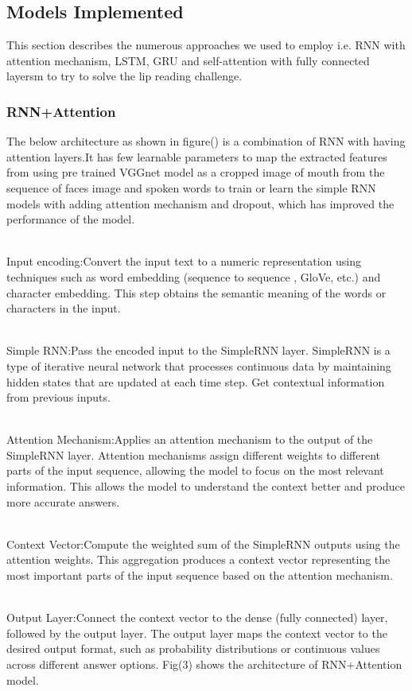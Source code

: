 \documentclass[conference]{IEEEtran}
\begin{document}
\subsection{Models Implemented}
This section describes the numerous approaches we used to employ i.e. RNN with attention mechanism, LSTM, GRU and self-attention with fully connected layersm to try to solve the lip reading challenge. 
\subsubsection{RNN+Attention}
The below architecture as shown in figure() is a combination of RNN with having attention layers.It has few learnable parameters to map the extracted features from using pre trained VGGnet model as a cropped image of mouth from the sequence of faces image and spoken words to train or learn the simple RNN models with adding attention mechanism and dropout, which has improved the performance of the model.

\\ Input encoding:Convert the input text to a numeric representation using techniques such as word embedding (sequence to sequence , GloVe, etc.) and character embedding. This step obtains the semantic meaning of the words or characters in the input.

\\ Simple RNN:Pass the encoded input to the SimpleRNN layer. SimpleRNN is a type of iterative neural network that processes continuous data by maintaining hidden states that are updated at each time step. Get contextual information from previous inputs. 

\\ Attention Mechanism:Applies an attention mechanism to the output of the SimpleRNN layer. Attention mechanisms assign different weights to different parts of the input sequence, allowing the model to focus on the most relevant information. This allows the model to understand the context better and produce more accurate answers.

\\ Context Vector:Compute the weighted sum of the SimpleRNN outputs using the attention weights. This aggregation produces a context vector representing the most important parts of the input sequence based on the attention mechanism. 

\\ Output Layer:Connect the context vector to the dense (fully connected) layer, followed by the output layer. The output layer maps the context vector to the desired output format, such as probability distributions or continuous values across different answer options. Fig(3) shows the architecture of RNN+Attention model.
\end{document}
